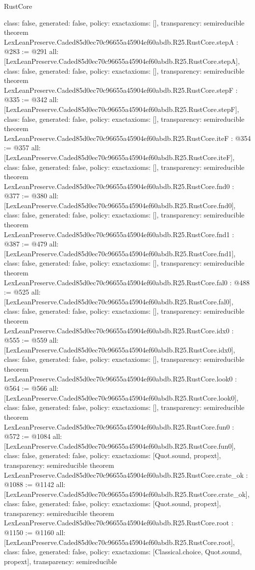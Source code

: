 \begin{lexlean}{RustCore}
\begin{coremodule}
{  class: false,
  generated: false,
  policy: exact{axioms: []},
  transparency: semireducible
}
theorem LexLeanPreserve.Caded85d0ec70c96655a45904ef60abdb.R25.RustCore.stepA : @283 := @291 {
  all: [LexLeanPreserve.Caded85d0ec70c96655a45904ef60abdb.R25.RustCore.stepA],
  class: false,
  generated: false,
  policy: exact{axioms: []},
  transparency: semireducible
}
theorem LexLeanPreserve.Caded85d0ec70c96655a45904ef60abdb.R25.RustCore.stepF : @335 := @342 {
  all: [LexLeanPreserve.Caded85d0ec70c96655a45904ef60abdb.R25.RustCore.stepF],
  class: false,
  generated: false,
  policy: exact{axioms: []},
  transparency: semireducible
}
theorem LexLeanPreserve.Caded85d0ec70c96655a45904ef60abdb.R25.RustCore.iteF : @354 := @357 {
  all: [LexLeanPreserve.Caded85d0ec70c96655a45904ef60abdb.R25.RustCore.iteF],
  class: false,
  generated: false,
  policy: exact{axioms: []},
  transparency: semireducible
}
theorem LexLeanPreserve.Caded85d0ec70c96655a45904ef60abdb.R25.RustCore.fnd0 : @377 := @380 {
  all: [LexLeanPreserve.Caded85d0ec70c96655a45904ef60abdb.R25.RustCore.fnd0],
  class: false,
  generated: false,
  policy: exact{axioms: []},
  transparency: semireducible
}
theorem LexLeanPreserve.Caded85d0ec70c96655a45904ef60abdb.R25.RustCore.fnd1 : @387 := @479 {
  all: [LexLeanPreserve.Caded85d0ec70c96655a45904ef60abdb.R25.RustCore.fnd1],
  class: false,
  generated: false,
  policy: exact{axioms: []},
  transparency: semireducible
}
theorem LexLeanPreserve.Caded85d0ec70c96655a45904ef60abdb.R25.RustCore.fal0 : @488 := @525 {
  all: [LexLeanPreserve.Caded85d0ec70c96655a45904ef60abdb.R25.RustCore.fal0],
  class: false,
  generated: false,
  policy: exact{axioms: []},
  transparency: semireducible
}
theorem LexLeanPreserve.Caded85d0ec70c96655a45904ef60abdb.R25.RustCore.idx0 : @555 := @559 {
  all: [LexLeanPreserve.Caded85d0ec70c96655a45904ef60abdb.R25.RustCore.idx0],
  class: false,
  generated: false,
  policy: exact{axioms: []},
  transparency: semireducible
}
theorem LexLeanPreserve.Caded85d0ec70c96655a45904ef60abdb.R25.RustCore.look0 : @564 := @566 {
  all: [LexLeanPreserve.Caded85d0ec70c96655a45904ef60abdb.R25.RustCore.look0],
  class: false,
  generated: false,
  policy: exact{axioms: []},
  transparency: semireducible
}
theorem LexLeanPreserve.Caded85d0ec70c96655a45904ef60abdb.R25.RustCore.fun0 : @572 := @1084 {
  all: [LexLeanPreserve.Caded85d0ec70c96655a45904ef60abdb.R25.RustCore.fun0],
  class: false,
  generated: false,
  policy: exact{axioms: [Quot.sound, propext]},
  transparency: semireducible
}
theorem LexLeanPreserve.Caded85d0ec70c96655a45904ef60abdb.R25.RustCore.crate_ok : @1088 := @1142 {
  all: [LexLeanPreserve.Caded85d0ec70c96655a45904ef60abdb.R25.RustCore.crate_ok],
  class: false,
  generated: false,
  policy: exact{axioms: [Quot.sound, propext]},
  transparency: semireducible
}
theorem LexLeanPreserve.Caded85d0ec70c96655a45904ef60abdb.R25.RustCore.root : @1150 := @1160 {
  all: [LexLeanPreserve.Caded85d0ec70c96655a45904ef60abdb.R25.RustCore.root],
  class: false,
  generated: false,
  policy: exact{axioms: [Classical.choice, Quot.sound, propext]},
  transparency: semireducible
}


\end{coremodule}
\end{lexlean}
